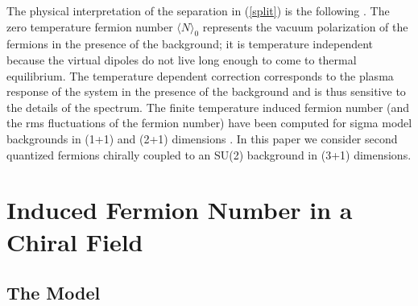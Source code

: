 \documentclass[a4paper,prd,showpacs,showkeys]{revtex4}
\begin{document}
The physical interpretation of the separation in (\ref{split}) is the following \cite{dunneian}. The zero temperature fermion number  $\langle N\rangle _0$ represents the vacuum polarization of the fermions in the presence of the background; it is temperature independent because the virtual dipoles do not live long enough to come to thermal equilibrium. The temperature dependent correction corresponds to the plasma response of the system in the presence of the background and is thus sensitive to the details of the spectrum. The finite temperature induced fermion number (and the rms fluctuations of the fermion number) have been computed for sigma model backgrounds in (1+1) and (2+1) dimensions \cite{dunneian,dunne,fluc,nonlinearsigma}. In this paper we consider second quantized fermions chirally coupled to an SU(2)  background in (3+1) dimensions.

\section{Induced Fermion Number in a Chiral Field}

\subsection{The Model}
\end{document}

